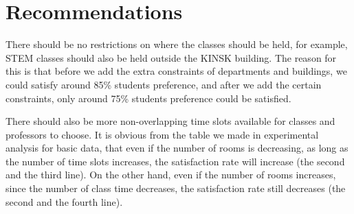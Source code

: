 \documentclass[11pt, oneside]{article}   	%
\begin{document}

\section{Recommendations}
There should be no restrictions on where the classes should be held, for example, STEM classes should also be held outside the KINSK building. The reason for this is that before we add the extra constraints of departments and buildings, we could satisfy around 85\% students preference, and after we add the certain constraints, only around 75\% students preference could be satisfied.

There should also be more non-overlapping time slots available for classes and professors to choose. It is obvious from the table we made in experimental analysis for basic data, that even if the number of rooms is decreasing, as long as the number of time slots increases, the satisfaction rate will increase (the second and the third line). On the other hand, even if the number of rooms increases, since the number of class time decreases, the satisfaction rate still decreases (the second and the fourth line).
\end{document}
